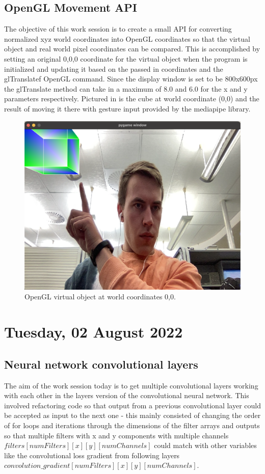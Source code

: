 \subsection{OpenGL Movement API}

The objective of this work session is to create a small API for converting normalized xyz world coordinates into OpenGL coordinates so that the virtual object and real world pixel coordinates can be compared. This is accomplished by setting an original 0,0,0 coordinate for the virtual object when the program is initialized and updating it based on the passed in coordinates and the glTranslatef OpenGL command. Since the display window is set to be 800x600px the glTranslate method can take in a maximum of 8.0 and 6.0 for the x and y parameters respectively. Pictured in  is the cube at world coordinate (0,0) and the result of moving it there with gesture input provided by the mediapipe library.

\begin{figure}[h]
    \centering
    \includegraphics[width=0.7\linewidth]{figures/opengl_cube_coordinate_system.png}
    \caption{OpenGL virtual object at world coordinates 0,0.}
    \label{fig:opengl_cube_coordinate_system}
\end{figure}

\section[2022/08/02]{Tuesday, 02 August 2022}
\subsection{Neural network convolutional layers}

The aim of the work session today is to get multiple convolutional layers working with each other in the layers version of the convolutional neural network. This involved refactoring code so that output from a previous convolutional layer could be accepted as input to the next one - this mainly consisted of changing the order of for loops and iterations through the dimensions of the filter arrays and outputs so that multiple filters with x and y components with multiple channels $filters[numFilters][x][y][numChannels]$ could match with other variables like the convolutional loss gradient from following layers $convolution\_gradient[numFilters][x][y][numChannels].$

